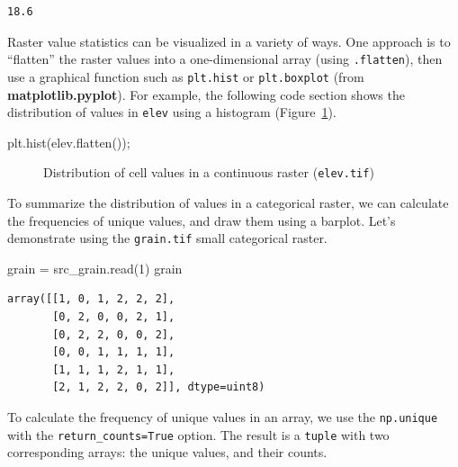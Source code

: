 \documentclass[
  letterpaper,
]{krantz}
\newenvironment{Shaded}{\begin{snugshade}}{\end{snugshade}}
\newcommand{\DecValTok}[1]{\textcolor[rgb]{0.68,0.00,0.00}{#1}}
\newcommand{\NormalTok}[1]{\textcolor[rgb]{0.00,0.23,0.31}{#1}}
\newcommand{\OperatorTok}[1]{\textcolor[rgb]{0.37,0.37,0.37}{#1}}
\begin{document}
\begin{verbatim}
18.6
\end{verbatim}

Raster value statistics can be visualized in a variety of ways. One
approach is to ``flatten'' the raster values into a one-dimensional
array (using \texttt{.flatten}), then use a graphical function such as
\texttt{plt.hist} or \texttt{plt.boxplot} (from
\textbf{matplotlib.pyplot}). For example, the following code section
shows the distribution of values in \texttt{elev} using a histogram
(Figure~\ref{fig-raster-hist}).

\begin{Shaded}
\begin{Highlighting}[]
\NormalTok{plt.hist(elev.flatten())}\OperatorTok{;}
\end{Highlighting}
\end{Shaded}

\begin{figure}[H]


\caption{\label{fig-raster-hist}Distribution of cell values in a
continuous raster (\texttt{elev.tif})}

\end{figure}%

To summarize the distribution of values in a categorical raster, we can
calculate the frequencies of unique values, and draw them using a
barplot. Let's demonstrate using the \texttt{grain.tif} small
categorical raster.

\begin{Shaded}
\begin{Highlighting}[]
\NormalTok{grain }\OperatorTok{=}\NormalTok{ src\_grain.read(}\DecValTok{1}\NormalTok{)}
\NormalTok{grain}
\end{Highlighting}
\end{Shaded}

\begin{verbatim}
array([[1, 0, 1, 2, 2, 2],
       [0, 2, 0, 0, 2, 1],
       [0, 2, 2, 0, 0, 2],
       [0, 0, 1, 1, 1, 1],
       [1, 1, 1, 2, 1, 1],
       [2, 1, 2, 2, 0, 2]], dtype=uint8)
\end{verbatim}

To calculate the frequency of unique values in an array, we use the
\texttt{np.unique} with the \texttt{return\_counts=True} option. The
result is a \texttt{tuple} with two corresponding arrays: the unique
values, and their counts.
\end{document}
